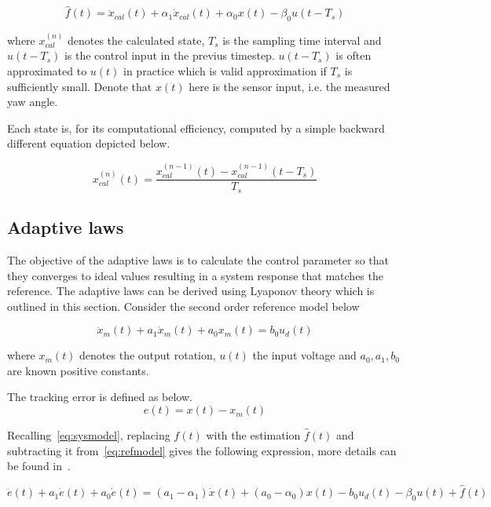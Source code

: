 \begin{equation}
  \label{eq:perturbation}
  \hat{f}(t) = \ddot{x}_{cal}(t) + \alpha_1\dot{x}_{cal}(t) +  \alpha_0x(t) - \beta_0u(t-T_s)
\end{equation}

where $x_{cal}^{(n)}$ denotes the calculated state, $T_s$ is the sampling time interval and $u(t-T_s)$ is the control input in the previus timestep. $u(t-T_s)$ is often approximated to $u(t)$ in practice which is valid approximation if $T_s$ is sufficiently small. Denote that $x(t)$ here is the sensor input, i.e. the measured yaw angle.

Each state is, for its computational efficiency, computed by a simple backward different equation depicted below.

\begin{equation}
  \label{eq:backward}
  x_{cal}^{(n)}(t) = \frac{x_{cal}^{(n-1)}(t) - x_{cal}^{(n-1)}(t-T_s)}{T_s}
\end{equation}

\subsection{Adaptive laws}
The objective of the adaptive laws is to calculate the control parameter so that they converges to ideal values resulting in a system response that matches the reference. The adaptive laws can be derived using Lyaponov theory which is outlined in this section. Consider the second order reference model below

\begin{equation}
  \label{eq:refmodel}
  \ddot{x}_m(t) + a_1\dot{x}_m(t) +  a_0x_m(t) = b_0u_d(t)
\end{equation}

where $x_m(t)$ denotes the output rotation, $u(t)$ the input voltage and $a_0, a_1, b_0$ are known positive constants.

The tracking error is defined as below.
\begin{equation}
  \label{eq:stateerror}
  e(t) = x(t) - x_m(t)
\end{equation}

Recalling~\eqref{eq:sysmodel}, replacing $f(t)$ with the estimation $\hat{f}(t)$ and subtracting it from~\eqref{eq:refmodel} gives the following expression, more details can be found in~\cite{Qingson:2016}.

\begin{equation}
  \ddot{e}(t) + a_1\dot{e}(t) + a_0\dot{e}(t) =  (a_1-\alpha_1)\dot{x}(t) + (a_0-\alpha_0)x(t) - b_0u_d(t) - \beta_0u(t) + \hat{f}(t)
\end{equation}

